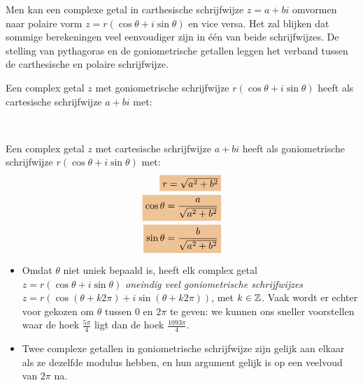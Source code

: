 \documentclass{ximera}
\begin{document}
 

 
 
Men kan een complexe getal in carthesische schrijfwijze $z=a+bi$ omvormen naar polaire vorm $z = r(\cos \theta + i\sin\theta)$ en vice versa. Het zal blijken dat sommige berekeningen veel eenvoudiger zijn in één van beide schrijfwijzes. De stelling van pythagoras en de goniometrische getallen leggen het verband tussen de carthesische en polaire schrijfwijze. 

\begin{proposition}\label{eig:transformatie_complexe_getallen} \nl
     
    Een complex getal $z$ met goniometrische schrijfwijze $r(\cos \theta + i\sin\theta)$ heeft als cartesische schrijfwijze $a+bi$ met:
    \begin{center}
        \\
    \end{center}
    Een complex getal $z$ met cartesische schrijfwijze $a+bi$ heeft als goniometrische schrijfwijze $r(\cos \theta + i\sin\theta)$ met:
    \begin{align*}
    \important{r = \sqrt{a^2+b^2}} \\
    \important{\cos\theta  = \dfrac{a}{\sqrt{a^2+b^2}}}\\
    \important{\sin\theta  = \dfrac{b}{\sqrt{a^2+b^2}}}
    \end{align*}
\end{proposition}

 
\begin{remark}\nl
     
    \begin{itemize}
        \item Omdat $\theta$ niet uniek bepaald is, heeft elk complex getal $z = r(\cos\theta+i\sin\theta)$ \textit{oneindig veel goniometrische schrijfwijzes} $z = r\left(\cos(\theta+k2\pi)+i\sin(\theta+k2\pi) \right)$, met $k\in\mathbb{Z}$. Vaak wordt er echter voor gekozen om $\theta$ tussen 0 en $2\pi$ te geven: we kunnen ons sneller voorstellen waar de hoek $\frac{5\pi}{4}$ ligt dan de hoek $\frac{1093\pi}{4}$.
        \item Twee complexe getallen in goniometrische schrijfwijze zijn gelijk aan elkaar als ze dezelfde modulus hebben, en hun argument gelijk is op een veelvoud van $2\pi$ na.
    \end{itemize}
     
\end{remark}
 
\end{document}

